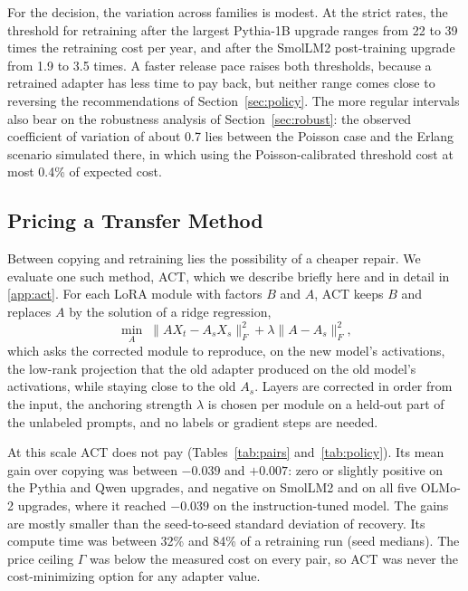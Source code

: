 \documentclass[preprint,12pt,authoryear]{elsarticle}
\begin{document}
For the decision, the variation across families is modest. At the strict rates, the threshold for retraining after the largest Pythia-1B upgrade ranges from 22 to 39 times the retraining cost per year, and after the SmolLM2 post-training upgrade from 1.9 to 3.5 times. A faster release pace raises both thresholds, because a retrained adapter has less time to pay back, but neither range comes close to reversing the recommendations of Section~\ref{sec:policy}. The more regular intervals also bear on the robustness analysis of Section~\ref{sec:robust}: the observed coefficient of variation of about 0.7 lies between the Poisson case and the Erlang scenario simulated there, in which using the Poisson-calibrated threshold cost at most 0.4\% of expected cost.

\subsection{Pricing a Transfer Method}\label{sec:act-results}

Between copying and retraining lies the possibility of a cheaper repair. We evaluate one such method, ACT, which we describe briefly here and in detail in \ref{app:act}. For each LoRA module with factors $B$ and $A$, ACT keeps $B$ and replaces $A$ by the solution of a ridge regression,
\begin{equation}\label{eq:act}
\min_{A}\;\|AX_t-A_sX_s\|_F^2+\lambda\|A-A_s\|_F^2,
\end{equation}
which asks the corrected module to reproduce, on the new model's activations, the low-rank projection that the old adapter produced on the old model's activations, while staying close to the old $A_s$. Layers are corrected in order from the input, the anchoring strength $\lambda$ is chosen per module on a held-out part of the unlabeled prompts, and no labels or gradient steps are needed.

At this scale ACT does not pay (Tables~\ref{tab:pairs} and~\ref{tab:policy}). Its mean gain over copying was between $-0.039$ and $+0.007$: zero or slightly positive on the Pythia and Qwen upgrades, and negative on SmolLM2 and on all five OLMo-2 upgrades, where it reached $-0.039$ on the instruction-tuned model. The gains are mostly smaller than the seed-to-seed standard deviation of recovery. Its compute time was between 32\% and 84\% of a retraining run (seed medians). The price ceiling $\Gamma$ was below the measured cost on every pair, so ACT was never the cost-minimizing option for any adapter value.
\end{document}
